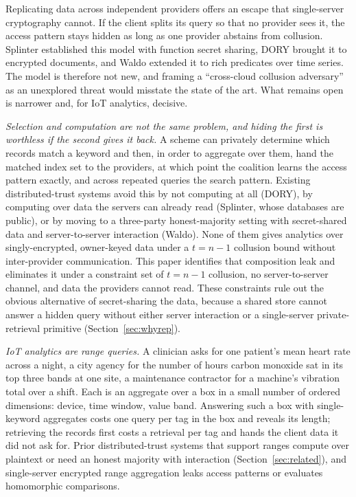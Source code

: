 \documentclass[a4paper,fleqn]{cas-sc}
\begin{document}
Replicating data across independent providers offers an escape that
single-server cryptography cannot. If the client splits its query so that no
provider sees it, the access pattern stays hidden as long as one provider
abstains from collusion. Splinter \citep{splinter} established this model with
function secret sharing, DORY \citep{dory} brought it to encrypted documents,
and Waldo \citep{waldo} extended it to rich predicates over time series. The
model is therefore not new, and framing a ``cross-cloud collusion adversary''
as an unexplored threat would misstate the state of the art. What remains open
is narrower and, for IoT analytics, decisive.

\emph{Selection and computation are not the same problem, and hiding the first
is worthless if the second gives it back.} A scheme can privately determine
which records match a keyword and then, in order to aggregate over them, hand
the matched index set to the providers, at which point the coalition learns
the access pattern exactly, and across repeated queries the search pattern.
Existing distributed-trust systems avoid this by not computing at all (DORY),
by computing over data the servers can already read (Splinter, whose databases
are public), or by moving to a three-party honest-majority setting with
secret-shared data and server-to-server interaction (Waldo). None of them
gives analytics over singly-encrypted, owner-keyed data under a $t=n-1$
collusion bound without inter-provider communication. This paper identifies
that composition leak and eliminates it under a constraint set of $t=n-1$
collusion, no server-to-server channel, and data the providers cannot read.
These constraints rule out the obvious alternative of secret-sharing the
data, because a shared store cannot answer a hidden query without either
server interaction or a single-server private-retrieval primitive
(Section~\ref{sec:whyrep}).

\emph{IoT analytics are range queries.} A clinician asks for one patient's
mean heart rate across a night, a city agency for the number of hours carbon
monoxide sat in its top three bands at one site, a maintenance contractor for a
machine's vibration total over a shift. Each is an aggregate over a box in a
small number of ordered dimensions: device, time window, value band. Answering
such a box with single-keyword aggregates costs one query per tag in the box
and reveals its length; retrieving the records first costs a retrieval per tag
and hands the client data it did not ask for. Prior distributed-trust systems
that support ranges compute over plaintext or need an honest majority with
interaction (Section~\ref{sec:related}), and single-server encrypted range
aggregation leaks access patterns or evaluates homomorphic comparisons.
\end{document}
